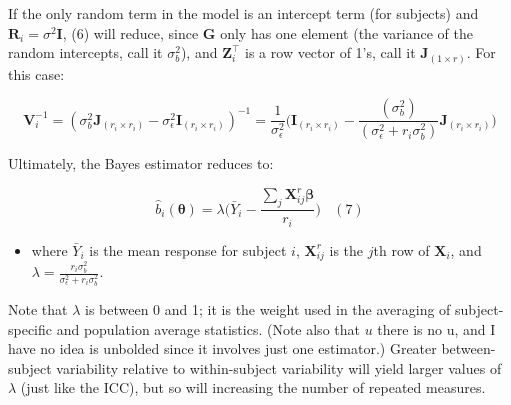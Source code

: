 \documentclass[
  9pt,
  ignorenonframetext,
]{beamer}
\providecommand{\tightlist}{%
  \setlength{\itemsep}{0pt}\setlength{\parskip}{0pt}}
\begin{document}
\begin{frame}{}
\protect\hypertarget{section-7}{}
If the only random term in the model is an intercept term (for subjects)
and \(\pmb R_i=\sigma^2 \pmb I\), (6) will reduce, since \(\pmb G\) only
has one element (the variance of the random intercepts, call it
\(\sigma_b^2\)), and \(\pmb Z_i^{\top}\) is a row vector of 1's, call it
\(\pmb J_{(1\times r)}\). For this case:

\[
\pmb V_i^{-1}=(\sigma_b^2 \pmb J_{(r_i\times r_i )}-\sigma_\epsilon^2 \pmb I_{(r_i\times r_i )} )^{-1}=
\frac 1 {\sigma _\epsilon^2} {\Big(\pmb I_{(r_i\times r_i )} - \frac {(\sigma_b^2)}{ (\sigma_\epsilon^2+r_i \sigma_b^2 )} \pmb J_{(r_i\times r_i )} \Big)}  
\]

Ultimately, the Bayes estimator reduces to:

\[ 
{\hat b}_i (\pmb \theta) = \lambda \Big(\bar Y_i - \frac {\sum_j \pmb X_{ij}^r \pmb \beta} {r_i}\Big) \ \ \ \ (7)
\]

\begin{itemize}
\tightlist
\item
  where \({\bar Y_i}\) is the mean response for subject \(i\),
  \(\pmb X_{ij}^r\) is the \(j\)th row of \(\pmb X_i\), and
  \(\lambda=\frac {r_i \sigma_b^2} {\sigma_\epsilon^2+r_i \sigma_b^2}\).
\end{itemize}

Note that \(\lambda\) is between 0 and 1; it is the weight used in the
averaging of subject-specific and population average statistics. (Note
also that \(u\) \alert {there is no u, and I have no idea} is unbolded
since it involves just one estimator.) Greater between-subject
variability relative to within-subject variability will yield larger
values of \(\lambda\) (just like the ICC), but so will increasing the
number of repeated measures.
\end{frame}
\end{document}
